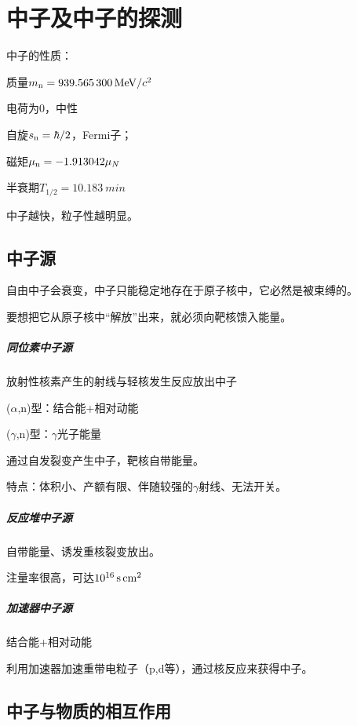 \chapter{中子及中子的探测}
中子的性质：
\begin{compactitem}
	\item 质量$m_\mathrm n=\SI{939.565300}{MeV}/c^2$
	\item 电荷为0，中性
	\item 自旋$s_\mathrm n=\hbar/2$，Fermi子； 
	\item 磁矩$\mu_\mathrm n=-1.913042\mu_N$
	\item 半衰期$T_{1/2}=\SI{10.183}{min}$
\end{compactitem}
中子越快，粒子性越明显。

\section{中子源}

自由中子会衰变，中子只能稳定地存在于原子核中，它必然是被束缚的。

要想把它从原子核中“解放”出来，就必须向靶核馈入能量。
\paragraph{同位素中子源}放射性核素产生的射线与轻核发生反应放出中子
\begin{compactitem}
	\item ($\alpha$,n)型：结合能+相对动能
	\item ($\gamma$,n)型：$\gamma$光子能量 
\end{compactitem}
通过自发裂变产生中子，靶核自带能量。

特点：体积小、产额有限、伴随较强的$\gamma$射线、无法开关。
\paragraph{反应堆中子源}自带能量、诱发重核裂变放出。

注量率很高，可达$\SI{E16}{/s.cm^2}$
\paragraph{加速器中子源}结合能+相对动能

利用加速器加速重带电粒子（p,d等），通过核反应来获得中子。

\section{中子与物质的相互作用}


